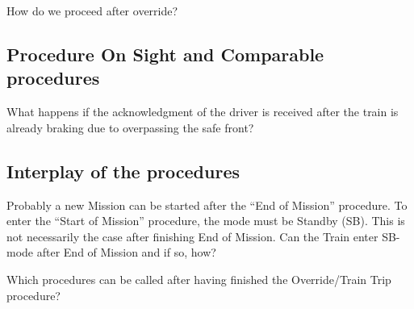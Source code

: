 \documentclass{template/openetcs_article}
\begin{document}
How do we proceed after override?

\subsection{Procedure On Sight and Comparable procedures}

What happens if the acknowledgment of the driver is received after the train is already braking due to overpassing the safe front?

\subsection{Interplay of the procedures}

Probably a new Mission can be started after the ``End of Mission'' procedure.
To enter the ``Start of Mission'' procedure, the mode must be Standby (SB).
This is not necessarily the case after finishing End of Mission. 
Can the Train enter SB-mode after End of Mission and if so, how?

Which procedures can be called after having finished the Override/Train Trip procedure?









\end{document}
